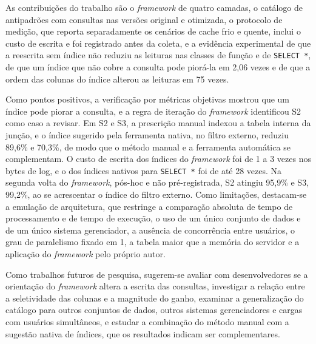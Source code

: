 As contribuições do trabalho são o \textit{framework} de quatro camadas, o catálogo de antipadrões com consultas nas versões original e otimizada, o protocolo de medição, que reporta separadamente os cenários de cache frio e quente, inclui o custo de escrita e foi registrado antes da coleta, e a evidência experimental de que a reescrita sem índice não reduziu as leituras nas classes de função e de \texttt{SELECT *}, de que um índice que não cobre a consulta pode piorá-la em 2,06 vezes e de que a ordem das colunas do índice alterou as leituras em 75 vezes.

Como pontos positivos, a verificação por métricas objetivas mostrou que um índice pode piorar a consulta, e a regra de iteração do \textit{framework} identificou S2 como caso a revisar. Em S2 e S3, a prescrição manual indexou a tabela interna da junção, e o índice sugerido pela ferramenta nativa, no filtro externo, reduziu 89,6\% e 70,3\%, de modo que o método manual e a ferramenta automática se complementam. O custo de escrita dos índices do \textit{framework} foi de 1 a 3 vezes nos bytes de log, e o dos índices nativos para \texttt{SELECT *} foi de até 28 vezes. Na segunda volta do \textit{framework}, pós-hoc e não pré-registrada, S2 atingiu 95,9\% e S3, 99,2\%, ao se acrescentar o índice do filtro externo. Como limitações, destacam-se a emulação de arquitetura, que restringe a comparação absoluta de tempo de processamento e de tempo de execução, o uso de um único conjunto de dados e de um único sistema gerenciador, a ausência de concorrência entre usuários, o grau de paralelismo fixado em 1, a tabela maior que a memória do servidor e a aplicação do \textit{framework} pelo próprio autor.

Como trabalhos futuros de pesquisa, sugerem-se avaliar com desenvolvedores se a orientação do \textit{framework} altera a escrita das consultas, investigar a relação entre a seletividade das colunas e a magnitude do ganho, examinar a generalização do catálogo para outros conjuntos de dados, outros sistemas gerenciadores e cargas com usuários simultâneos, e estudar a combinação do método manual com a sugestão nativa de índices, que os resultados indicam ser complementares. 
